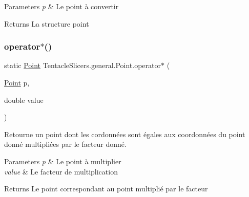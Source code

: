 \begin{DoxyParams}{Parameters}
{\em p} & Le point à convertir \\
\hline
\end{DoxyParams}
\begin{DoxyReturn}{Returns}
La structure point 
\end{DoxyReturn}
\mbox{\label{class_tentacle_slicers_1_1general_1_1_point_a56d010f0b60368b82de8cbb7b78116e8}} 
\subsubsection{\texorpdfstring{operator$\ast$()}{operator*()}}
{\footnotesize\ttfamily static \hyperlink{class_tentacle_slicers_1_1general_1_1_point}{Point} Tentacle\+Slicers.\+general.\+Point.\+operator$\ast$ (\begin{DoxyParamCaption}\item[{\hyperlink{class_tentacle_slicers_1_1general_1_1_point}{Point}}]{p,  }\item[{double}]{value }\end{DoxyParamCaption})\hspace{0.3cm}{\ttfamily [static]}}



Retourne un point dont les cordonnées sont égales aux coordonnées du point donné multipliées par le facteur donné. 


\begin{DoxyParams}{Parameters}
{\em p} & Le point à multiplier \\
\hline
{\em value} & Le facteur de multiplication \\
\hline
\end{DoxyParams}
\begin{DoxyReturn}{Returns}
Le point correspondant au point multiplié par le facteur 
\end{DoxyReturn}
\mbox{\label{class_tentacle_slicers_1_1general_1_1_point_aa3a4315cd28f6c91a471120f5e45869c}} 
